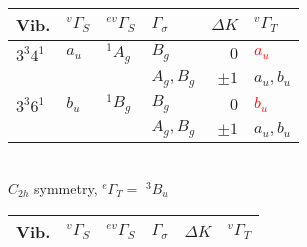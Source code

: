 \documentclass[12pt,draft]{mitthesis}
\begin{document}
\begin{table}
  \centering
  \begin{tabular}{llllrl}
    Vib.
    & $^{v}\Gamma_S$ & $^{ev}\Gamma_S$ & $\Gamma_\sigma$ 
    & $\Delta K$ & $^{v}\Gamma_T$ \\
    \toprule




    $3^3 4^1$ 
    & $a_u$ & $^{1}A_g$ & $B_g$ & $0$ & \textcolor{red}{$a_u$} \\
    & & & $A_g, B_g$ & $\pm1$ & $a_u, b_u$ \\[10pt]

    $3^3 6^1$ 
    & $b_u$ & $^{1}B_g$ & $B_g$ & $0$ & \textcolor{red}{$b_u$} \\
    & & & $A_g, B_g$ & $\pm1$ & $a_u, b_u$ \\

  \end{tabular}\\[5mm]
  
  $C_{2h}$ symmetry, $^{e}\Gamma_T =$ $^{3}B_u$\\[1cm]

  \begin{tabular}{llllrl}
    Vib.
    & $^{v}\Gamma_S$ & $^{ev}\Gamma_S$ & $\Gamma_\sigma$ & $\Delta K$ & $^{v}\Gamma_T$ \\
    \toprule

    

\end{tabular}
\end{table}
\end{document}

